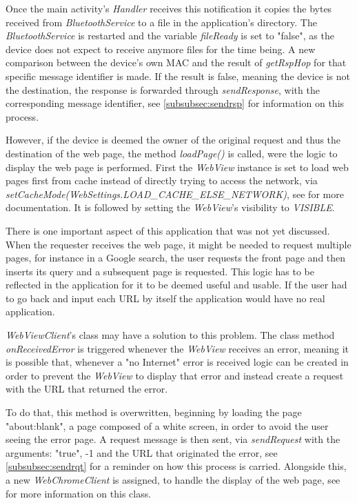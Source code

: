 Once the main activity's \textit{Handler} receives this notification it copies the bytes received from \textit{BluetoothService} to a file in the application's directory. The \textit{BluetoothService} is restarted and the variable \textit{fileReady} is set to "false", as the device does not expect to receive anymore files for the time being. A new comparison between the device's own \gls{MAC} and the result of \textit{getRspHop} for that specific message identifier is made. If the result is false, meaning the device is not the destination, the response is forwarded through \textit{sendResponse}, with the corresponding message identifier, see \ref{subsubsec:sendrsp} for information on this process.

However, if the device is deemed the owner of the original request and thus the destination of the web page, the method \textit{loadPage()} is called, were the logic to display the web page is performed. First the \textit{WebView} instance is set to load web pages first from cache instead of directly trying to access the network, via \textit{setCacheMode(WebSettings.LOAD\_CACHE\_ELSE\_NETWORK)}, see \cite{webview} for more documentation. It is followed by setting the \textit{WebView}'s visibility to \textit{VISIBLE}.


There is one important aspect of this application that was not yet discussed. When the requester receives the web page, it might be needed to request multiple pages, for instance in a Google search, the user requests the front page and then inserts its query and a subsequent page is requested. This logic has to be reflected in the application for it to be deemed useful and usable. If the user had to go back and input each \gls{URL} by itself the application would have no real application.

\textit{WebViewClient}'s class may have a solution to this problem. The class method \textit{onReceivedError} is triggered whenever the \textit{WebView} receives an error, meaning it is possible that, whenever a "no Internet" error is received logic can be created in order to prevent the \textit{WebView} to display that error and instead create a request with the \gls{URL} that returned the error.

To do that, this method is overwritten, beginning by loading the page "about:blank", a page composed of a white screen, in order to avoid the user seeing the error page. A request message is then sent, via \textit{sendRequest} with the arguments: "true", -1 and the \gls{URL} that originated the error, see \ref{subsubsec:sendrqt} for a reminder on how this process is carried. Alongside this, a new \textit{WebChromeClient} is assigned, to handle the display of the web page, see \cite{webview} for more information on this class.

